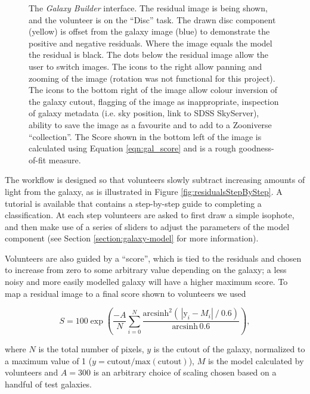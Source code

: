 \documentclass[trackchanges]{aastex63}
\begin{document}
\begin{figure}
  \caption{The \textit{Galaxy Builder} interface. The residual image is being shown, and the volunteer is on the ``Disc'' task. The drawn disc component (yellow) is offset from the galaxy image (blue) to demonstrate the positive and negative residuals. Where the image equals the model the residual is black. The dots below the residual image allow the user to switch images. The icons to the right allow panning and zooming of the image (rotation was not functional for this project). The icons to the bottom right of the image allow colour inversion of the galaxy cutout, flagging of the image as inappropriate, inspection of galaxy metadata (i.e. sky position, link to SDSS SkyServer), ability to save the image as a favourite and to add to a Zooniverse ``collection''. The Score shown in the bottom left of the image is calculated using Equation \ref{eqn:gal_score} and is a rough goodness-of-fit measure.}
  \label{fig:interfaceInProgress}
\end{figure}


The workflow is designed so that volunteers slowly subtract increasing amounts of light from the galaxy, as is illustrated in Figure \ref{fig:residualsStepByStep}. A tutorial is available that contains a step-by-step guide to completing a classification. At each step volunteers are asked to first draw a simple isophote, and then make use of a series of sliders to adjust the parameters of the model component (see Section \ref{section:galaxy-model} for more information).

Volunteers are also guided by a ``score'', which is tied to the residuals and chosen to increase from zero to some arbitrary value depending on the galaxy; a less noisy and more easily modelled galaxy will have a higher maximum score. To map a residual image to a final score shown to volunteers we used

\begin{equation}
  \label{eqn:gal_score}
    S = 100 \exp\left(\frac{-A}{N}\sum_{i=0}^N\frac{\text{arcsinh}^2\left(\,|\text{y}_i - M_i|\ /\ 0.6\right)}{\text{arcsinh}\,0.6 }\right),
\end{equation}

where $N$ is the total number of pixels, $y$ is the cutout of the galaxy, normalized to a maximum value of 1 ($y = \text{cutout}/\text{max}(\text{cutout})$), $M$ is the model calculated by volunteers and $A=300$ is an arbitrary choice of scaling chosen based on a handful of test galaxies.
\end{document}
